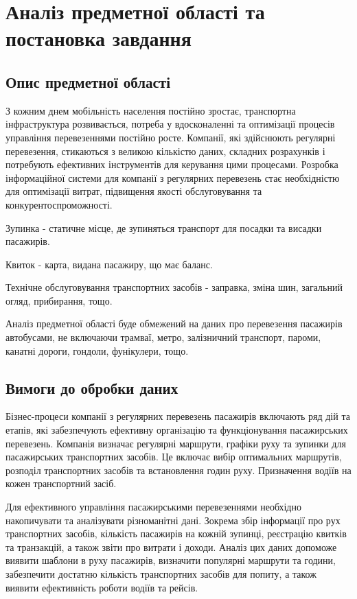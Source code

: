 \documentclass[oneside,14pt]{extarticle}
\begin{document}
\section{Аналіз предметної області та постановка завдання}
\subsection{Опис предметної області}
З кожним днем мобільність населення постійно зростає, транспортна інфраструктура розвивається, потреба у вдосконаленні та оптимізації процесів управління перевезеннями постійно росте. Компанії, які здійснюють регулярні перевезення, стикаються з великою кількістю даних, складних розрахунків і потребують ефективних інструментів для керування цими процесами. Розробка інформаційної системи для компанії з регулярних перевезень стає необхідністю для оптимізації витрат, підвищення якості обслуговування та конкурентоспроможності.

\begin{list}{-}{Специфікація важливих понять:}
\item Зупинка - статичне місце, де зупиняться транспорт для посадки та висадки пасажирів.
\item Квиток - карта, видана пасажиру, що має баланс.
\item Технічне обслуговування транспортних засобів - заправка, зміна шин, загальний огляд, прибирання, тощо.
\end{list}

Аналіз предметної області буде обмежений на даних про перевезення пасажирів автобусами, не включаючи трамваї, метро, залізничний транспорт, пароми, канатні дороги, гондоли, фунікулери, тощо.

\subsection{Вимоги до обробки даних}
Бізнес-процеси компанії з регулярних перевезень пасажирів включають ряд дій та етапів, які забезпечують ефективну організацію та функціонування пасажирських перевезень. Компанія визначає регулярні маршрути, графіки руху та зупинки для пасажирських транспортних засобів. Це включає вибір оптимальних маршрутів, розподіл транспортних засобів та встановлення годин руху. Призначення водіїв на кожен транспортний засіб.

Для ефективного управління пасажирськими перевезеннями необхідно накопичувати та аналізувати різноманітні дані. Зокрема збір інформації про рух транспортних засобів, кількість пасажирів на кожній зупинці, реєстрацію квитків та транзакцій, а також звіти про витрати і доходи. Аналіз цих даних допоможе виявити шаблони в руху пасажирів, визначити популярні маршрути та години, забезпечити достатню кількість транспортних засобів для попиту, а також виявити ефективність роботи водіїв та рейсів.
\end{document}
